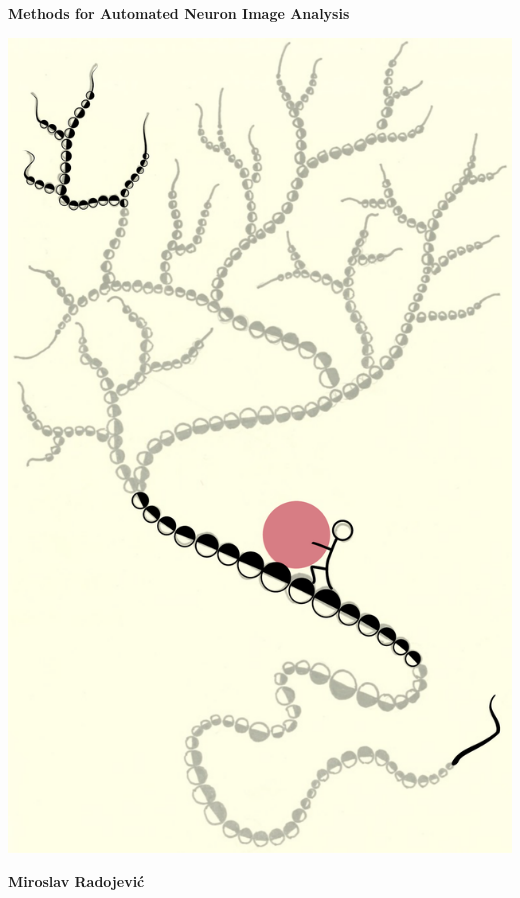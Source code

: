 \documentclass[10pt, oneside]{report}
\begin{document}
	\pagecolor{backgroundColor}
	\thispagestyle{empty}
	\begin{center}
		{\Huge\bf Methods for Automated Neuron Image Analysis\\}%
	\end{center}
	
	\vfill
	
	\begin{center}
		\includegraphics[height=0.9\linewidth]{syziphus}
	\end{center}
	
	\vfill
	
	\begin{center}
		{\Large\bf Miroslav Radojevi\'{c}}
	\end{center}
\end{document}
